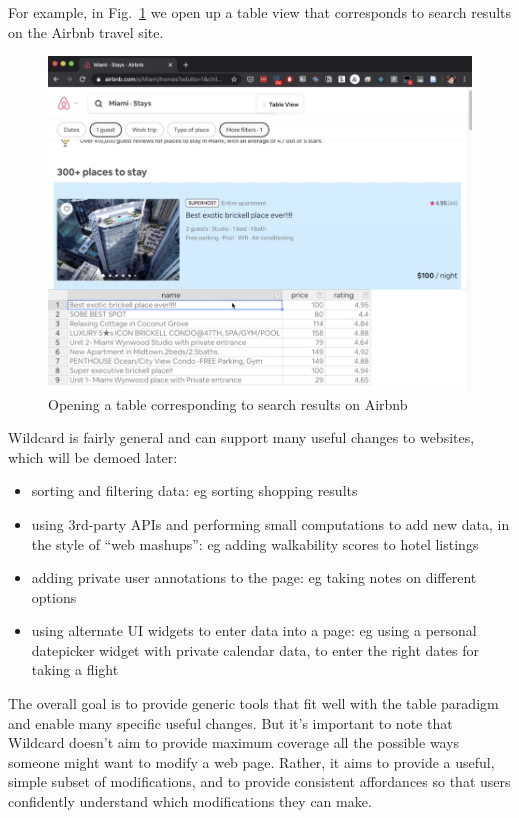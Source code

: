 \documentclass[english,submission]{programming}
\providecommand{\tightlist}{%
  \setlength{\itemsep}{0pt}\setlength{\parskip}{0pt}}
\begin{document}
For example, in Fig.~\ref{fig:table} we open up a table view that
corresponds to search results on the Airbnb travel site.

\begin{figure}
\hypertarget{fig:table}{%
\centering
\includegraphics{media/opentable.png}
\caption{Opening a table corresponding to search results on
Airbnb}\label{fig:table}
}
\end{figure}

Wildcard is fairly general and can support many useful changes to
websites, which will be demoed later:

\begin{itemize}
\tightlist
\item
  sorting and filtering data: eg sorting shopping results
\item
  using 3rd-party APIs and performing small computations to add new
  data, in the style of ``web mashups'': eg adding walkability scores to
  hotel listings
\item
  adding private user annotations to the page: eg taking notes on
  different options
\item
  using alternate UI widgets to enter data into a page: eg using a
  personal datepicker widget with private calendar data, to enter the
  right dates for taking a flight
\end{itemize}

The overall goal is to provide generic tools that fit well with the
table paradigm and enable many specific useful changes. But it's
important to note that Wildcard doesn't aim to provide maximum coverage
all the possible ways someone might want to modify a web page. Rather,
it aims to provide a useful, simple subset of modifications, and to
provide consistent affordances so that users confidently understand
which modifications they can make.
\end{document}
